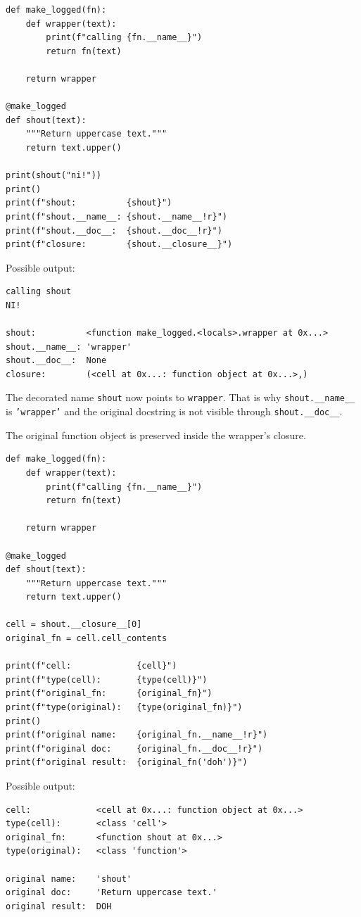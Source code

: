 \begin{verbatim}
def make_logged(fn):
    def wrapper(text):
        print(f"calling {fn.__name__}")
        return fn(text)

    return wrapper

@make_logged
def shout(text):
    """Return uppercase text."""
    return text.upper()

print(shout("ni!"))
print()
print(f"shout:          {shout}")
print(f"shout.__name__: {shout.__name__!r}")
print(f"shout.__doc__:  {shout.__doc__!r}")
print(f"closure:        {shout.__closure__}")
\end{verbatim}

Possible output:

\begin{verbatim}
calling shout
NI!

shout:          <function make_logged.<locals>.wrapper at 0x...>
shout.__name__: 'wrapper'
shout.__doc__:  None
closure:        (<cell at 0x...: function object at 0x...>,)
\end{verbatim}

The decorated name \texttt{shout} now points to \texttt{wrapper}. That is why \texttt{shout.\_\_name\_\_} is \texttt{'wrapper'} and the original docstring is not visible through \texttt{shout.\_\_doc\_\_}.

The original function object is preserved inside the wrapper's closure.

\begin{verbatim}
def make_logged(fn):
    def wrapper(text):
        print(f"calling {fn.__name__}")
        return fn(text)

    return wrapper

@make_logged
def shout(text):
    """Return uppercase text."""
    return text.upper()

cell = shout.__closure__[0]
original_fn = cell.cell_contents

print(f"cell:             {cell}")
print(f"type(cell):       {type(cell)}")
print(f"original_fn:      {original_fn}")
print(f"type(original):   {type(original_fn)}")
print()
print(f"original name:    {original_fn.__name__!r}")
print(f"original doc:     {original_fn.__doc__!r}")
print(f"original result:  {original_fn('doh')}")
\end{verbatim}

Possible output:

\begin{verbatim}
cell:             <cell at 0x...: function object at 0x...>
type(cell):       <class 'cell'>
original_fn:      <function shout at 0x...>
type(original):   <class 'function'>

original name:    'shout'
original doc:     'Return uppercase text.'
original result:  DOH
\end{verbatim}

